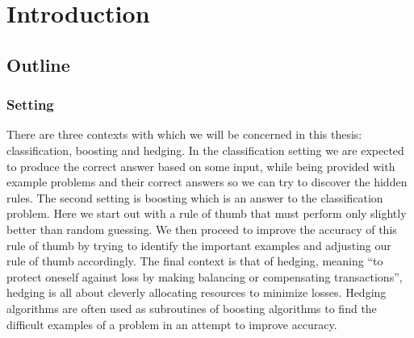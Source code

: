 
\chapter{Introduction}
\label{chap:intro}


\section{Outline}
\subsection{Setting}
There are three contexts with which we will be concerned in this thesis: classification, boosting and hedging.
In the classification setting we are expected to produce the correct answer based on some input, while being provided with example problems and their correct answers so we can try to discover the hidden rules. The second setting is boosting which is an answer to the classification problem. Here we start out with a rule of thumb that must perform only slightly better than random guessing. We then proceed to improve the accuracy of this rule of thumb by trying to identify the important examples and adjusting our rule of thumb accordingly. The final context is that of hedging, meaning ``to protect oneself against loss by making balancing or compensating transactions'', hedging is all about cleverly allocating resources to minimize losses. Hedging algorithms are often used as subroutines of boosting algorithms to find the difficult examples of a problem in an attempt to improve accuracy.

